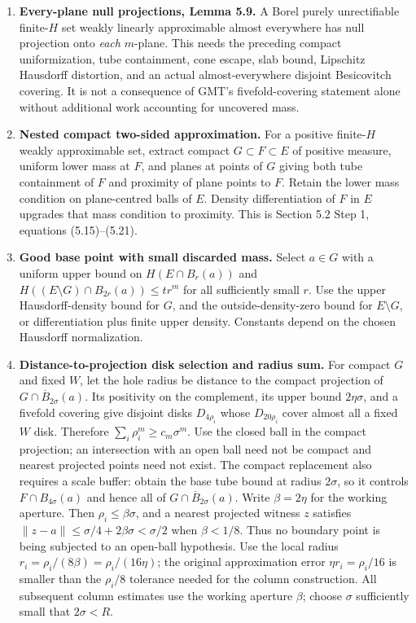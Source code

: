 \begin{enumerate}
\item \textbf{Every-plane null projections, Lemma 5.9.}
A Borel purely unrectifiable finite-$H$ set weakly linearly approximable
almost everywhere has null projection onto \emph{each} $m$-plane.
This needs the preceding compact uniformization, tube containment,
cone escape, slab bound, Lipschitz Hausdorff distortion, and an actual
almost-everywhere disjoint Besicovitch covering.
It is not a consequence of GMT's fivefold-covering statement alone without
additional work accounting for uncovered mass.

\item \textbf{Nested compact two-sided approximation.}
For a positive finite-$H$ weakly approximable set, extract compact
$G\subset F\subset E$ of positive measure, uniform lower mass at $F$, and
planes at points of $G$ giving both tube containment of $F$ and proximity of
plane points to $F$. Retain the lower mass condition on plane-centred balls
of $E$. Density differentiation of $F$ in $E$ upgrades that mass condition
to proximity. This is Section 5.2 Step 1, equations (5.15)--(5.21).

\item \textbf{Good base point with small discarded mass.}
Select $a\in G$ with a uniform upper bound on $H(E\cap B_r(a))$ and
$H((E\setminus G)\cap B_{2r}(a))\leq t r^m$ for all sufficiently small $r$.
Use the upper Hausdorff-density bound for $G$, and the outside-density-zero
bound for $E\setminus G$, or differentiation plus finite upper density.
Constants depend on the chosen Hausdorff normalization.

\item \textbf{Distance-to-projection disk selection and radius sum.}
For compact $G$ and fixed $W$, let the hole radius be distance to the compact
projection of $G\cap\overline B_{2\sigma}(a)$.
Its positivity on the complement, its upper bound $2\eta\sigma$, and a
fivefold covering give disjoint disks $D_{4\rho_i}$ whose $D_{20\rho_i}$
cover almost all a fixed $W$ disk. Therefore $\sum_i\rho_i^m\geq c_m\sigma^m$.
Use the closed ball in the compact projection; an intersection with an open
ball need not be compact and nearest projected points need not exist.
The compact replacement also requires a scale buffer: obtain the base tube
bound at radius $2\sigma$, so it controls $F\cap B_{4\sigma}(a)$ and hence
all of $G\cap\overline B_{2\sigma}(a)$. Write $\beta=2\eta$ for the
working aperture. Then $\rho_i\leq\beta\sigma$, and a nearest projected
witness $z$ satisfies
$\|z-a\|\leq\sigma/4+2\beta\sigma<\sigma/2$ when $\beta<1/8$.
Thus no boundary point is being subjected to an open-ball hypothesis.
Use the local radius $r_i=\rho_i/(8\beta)=\rho_i/(16\eta)$;
the original approximation error $\eta r_i=\rho_i/16$ is smaller than
the $\rho_i/8$ tolerance needed for the column construction.
All subsequent column estimates use the working aperture $\beta$;
choose $\sigma$ sufficiently small that $2\sigma<R$.


\end{enumerate}
